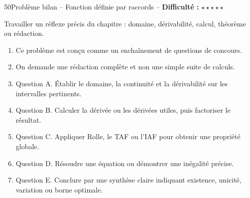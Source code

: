 \documentclass[11pt,a4paper]{article}
\newcommand{\etoiles}[1]{\textbf{Difficulté :} #1}
\begin{document}
\begin{exobox}{50}{Problème bilan -- Fonction définie par raccords -- \etoiles{$\star\star\star\star\star$}}

\begin{objectifbox}
Travailler un réflexe précis du chapitre : domaine, dérivabilité, calcul, théorème ou rédaction.
\end{objectifbox}

\begin{enumerate}

\item Ce problème est conçu comme un enchaînement de questions de concours.

\item On demande une rédaction complète et non une simple suite de calculs.

\item Question A. Établir le domaine, la continuité et la dérivabilité sur les intervalles pertinents.

\item Question B. Calculer la dérivée ou les dérivées utiles, puis factoriser le résultat.

\item Question C. Appliquer Rolle, le TAF ou l'IAF pour obtenir une propriété globale.

\item Question D. Résoudre une équation ou démontrer une inégalité précise.

\item Question E. Conclure par une synthèse claire indiquant existence, unicité, variation ou borne optimale.

\end{enumerate}

\end{exobox}


\newpage
\end{document}

